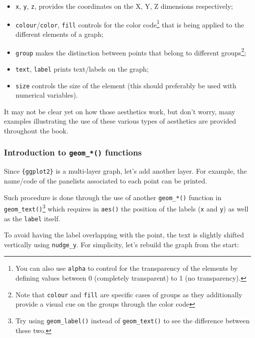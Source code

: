 \documentclass[
]{krantz}
\providecommand{\tightlist}{%
  \setlength{\itemsep}{0pt}\setlength{\parskip}{0pt}}
\begin{document}
\begin{itemize}
\tightlist
\item
  \texttt{x}, \texttt{y}, \texttt{z}, provides the coordinates on the X, Y, Z dimensions respectively;
\item
  \texttt{colour}/\texttt{color}, \texttt{fill} controls for the color code\footnote{You can also use \texttt{alpha} to control for the transparency of the elements by defining values between 0 (completely transparent) to 1 (no transparency).} that is being applied to the different elements of a graph;
\item
  \texttt{group} makes the distinction between points that belong to different groups\footnote{Note that \texttt{colour} and \texttt{fill} are specific cases of groups as they additionally provide a visual cue on the groups through the color code};
\item
  \texttt{text}, \texttt{label} prints text/labels on the graph;
\item
  \texttt{size} controls the size of the element (this should preferably be used with numerical variables).
\end{itemize}

It may not be clear yet on how those aesthetics work, but don't worry, many examples illustrating the use of these various types of aesthetics are provided throughout the book.

\hypertarget{linechart}{%
\subsubsection*{\texorpdfstring{Introduction to \texttt{geom\_*()} functions}{Introduction to geom\_*() functions}}\label{linechart}}


Since \texttt{\{ggplot2\}} is a multi-layer graph, let's add another layer. For example, the name/code of the panelists associated to each point can be printed.

Such procedure is done through the use of another \texttt{geom\_*()} function in \texttt{geom\_text()}\footnote{Try using \texttt{geom\_label()} instead of \texttt{geom\_text()} to see the difference between these two.} which requires in \texttt{aes()} the position of the labels (\texttt{x} and \texttt{y}) as well as the \texttt{label} itself.

To avoid having the label overlapping with the point, the text is slightly shifted vertically using \texttt{nudge\_y}. For simplicity, let's rebuild the graph from the start:
\end{document}
